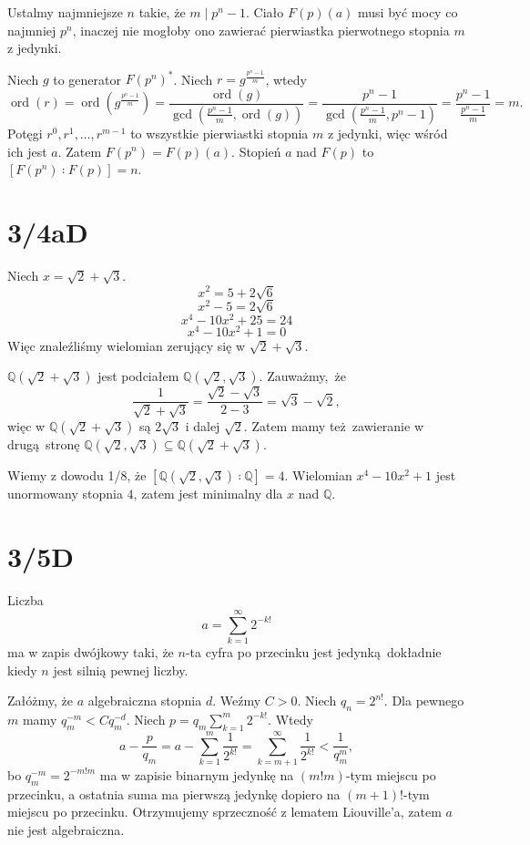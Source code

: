 \documentclass[a4paper, 12pt]{article}
\DeclareMathOperator{\ord}{ord}
\newcommand{\modulus}[1]{\left| #1 \right|}
\newcommand{\abs}{\modulus}
\newcommand{\+}{\enspace}
\begin{document}
Ustalmy najmniejsze $n$ takie, że $m \mid p^n-1$.
Ciało $F(p)(a)$ musi być mocy co najmniej $p^n$,
inaczej nie mogłoby ono zawierać pierwiastka pierwotnego stopnia $m$ z jedynki.

Niech $g$ to generator $F(p^n)^*$.
Niech $r = g^{\frac{p^n-1}{m}}$, wtedy
$$
\ord(r)
=\ord\left(g^{\frac{p^n-1}{m}}\right)
= \frac{\ord(g)}{\gcd\left(\frac{p^n-1}{m}, \ord(g)\right)}
= \frac{p^n-1}{\gcd\left(\frac{p^n-1}{m}, p^n-1\right)}
= \frac{p^n-1}{\frac{p^n-1}{m}}
= m.
$$
Potęgi $r^0, r^1, …, r^{m-1}$ to wszystkie pierwiastki stopnia $m$ z jedynki,
więc wśród ich jest $a$.
Zatem $F(p^n) = F(p)(a)$.
Stopień $a$ nad $F(p)$ to
$[F(p^n) ∶ F(p)] = n$.

\section*{3/4aD}
Niech $x = \sqrt{2}+\sqrt{3}$.
$$x^2 = 5 + 2\sqrt{6}$$
$$x^2-5= 2\sqrt{6}$$
$$x^4-10x^2+25=24$$
$$x^4-10x^2+1=0$$
Więc znaleźliśmy wielomian zerujący się w $\sqrt{2}+\sqrt{3}$.

$ℚ(\sqrt{2}+\sqrt{3})$ jest podciałem $ℚ(\sqrt{2},\sqrt{3})$.
Zauważmy, że
$$\frac{1}{\sqrt{2}+\sqrt{3}} = \frac{\sqrt{2}-\sqrt{3}}{2-3}=\sqrt{3}-\sqrt{2},$$
więc w $ℚ(\sqrt{2}+\sqrt{3})$ są $2\sqrt{3}$ i dalej $\sqrt{2}$.
Zatem mamy też zawieranie w drugą stronę $ℚ(\sqrt{2},\sqrt{3})⊆ℚ(\sqrt{2}+\sqrt{3})$.

Wiemy z dowodu 1/8, że $[ℚ(\sqrt{2}, \sqrt{3}) ∶ ℚ] = 4$.
Wielomian $x^4-10x^2+1$ jest unormowany stopnia $4$, zatem jest minimalny dla $x$ nad $ℚ$.

\section*{3/5D}

Liczba
$$a = ∑_{k=1}^∞ 2^{-k!}$$
ma w zapis dwójkowy taki, że $n$-ta cyfra po przecinku
jest jedynką dokładnie kiedy $n$ jest silnią pewnej liczby.

Załóżmy, że $a$ algebraiczna stopnia $d$.
Weźmy $C>0$.
Niech $q_n = 2^{n!}$.
Dla pewnego $m$ mamy $q_m^{-m} < C q_m^{-d}$.
Niech $p = q_m ∑_{k=1}^m 2^{-k!}$.
Wtedy
$$
a - \frac{p}{q_m}
= a - ∑_{k=1}^m \frac{1}{2^{k!}}
= ∑_{k=m+1}^∞ \frac{1}{2^{k!}}
< \frac{1}{q_m^m},$$
bo $q_m^{-m}=2^{-m!m}$ ma w zapisie binarnym jedynkę na $(m!m)$-tym miejscu
po przecinku,
a ostatnia suma ma pierwszą jedynkę dopiero na $(m+1)!$-tym miejscu po
przecinku.
Otrzymujemy sprzeczność z lematem Liouville'a, zatem $a$ nie jest algebraiczna.
\end{document}
